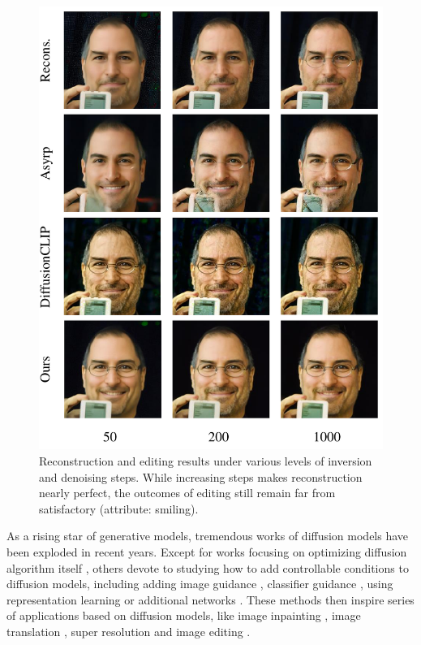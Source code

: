 \documentclass[letterpaper]{article} %
\begin{document}
\begin{figure}[t]
    \centering
    \includegraphics[width=0.9\columnwidth]{Figs/fig1.pdf}
    \caption{Reconstruction and editing results under various levels of inversion and denoising steps. While increasing steps makes reconstruction nearly perfect, the outcomes of editing still remain far from satisfactory (attribute: smiling).}
    \label{fig1}
\end{figure}

As a rising star of generative models, tremendous works of diffusion models \cite{ho2020denoising, song2020score} have been exploded in recent years. Except for works focusing on optimizing diffusion algorithm itself \cite{nichol2021improved, song2020denoising}, others devote to studying how to add controllable conditions to diffusion models, including adding image guidance \cite{choi2021ilvr}, classifier guidance \cite{dhariwal2021diffusion, avrahami2022blended}, using representation learning \cite{kwon2022diffusion} or additional networks \cite{rombach2022high, zhang2023adding}. These methods then inspire series of applications based on diffusion models, like image inpainting \cite{lugmayr2022repaint}, image translation \cite{meng2021sdedit}, super resolution \cite{ho2022cascaded} and image editing \cite{nichol2021glide, kwon2022diffusion, hertz2022prompt}. 
\end{document}
